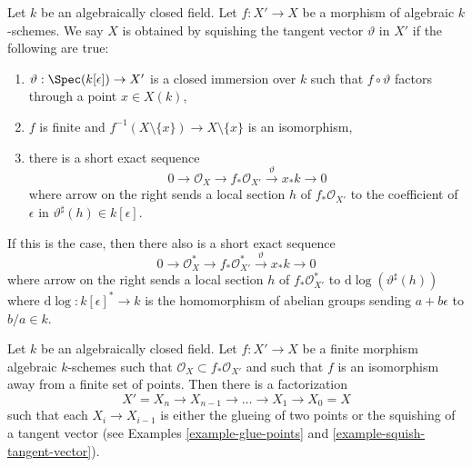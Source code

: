 \begin{example}
\label{example-squish-tangent-vector}
Let $k$ be an algebraically closed field. Let $f : X' \to X$
be a morphism of algebraic $k$-schemes. We say $X$ is
obtained by squishing the tangent vector $\vartheta$ in $X'$
if the following are true:
\begin{enumerate}
\item $\vartheta : \Spec(k[\epsilon]) \to X'$ is a closed immersion
over $k$ such that $f \circ \vartheta$ factors through a point $x \in X(k)$,
\item $f$ is finite and
$f^{-1}(X \setminus \{x\}) \to X \setminus \{x\}$ is an isomorphism,
\item there is a short exact sequence
$$
0 \to \mathcal{O}_X \to f_*\mathcal{O}_{X'} \xrightarrow{\vartheta} x_*k \to 0
$$
where arrow on the right sends a local section $h$ of $f_*\mathcal{O}_{X'}$
to the coefficient of $\epsilon$ in $\vartheta^\sharp(h) \in k[\epsilon]$.
\end{enumerate}
If this is the case, then there also is a short exact sequence
$$
0 \to \mathcal{O}_X^* \to f_*\mathcal{O}_{X'}^*
\xrightarrow{\vartheta} x_*k \to 0
$$
where arrow on the right sends a local section $h$ of $f_*\mathcal{O}_{X'}^*$
to $\text{d}\log(\vartheta^\sharp(h))$ where
$\text{d}\log : k[\epsilon]^* \to k$
is the homomorphism of abelian groups sending $a + b\epsilon$ to $b/a \in k$.
\end{example}

\begin{lemma}
\label{lemma-factor-almost-isomorphism}
Let $k$ be an algebraically closed field. Let $f : X' \to X$ be a
finite morphism algebraic $k$-schemes such that
$\mathcal{O}_X \subset f_*\mathcal{O}_{X'}$ and such that $f$ is an
isomorphism away from a finite set of points. Then there is a factorization
$$
X' = X_n \to X_{n - 1} \to \ldots \to X_1 \to X_0 = X
$$
such that each $X_i \to X_{i - 1}$ is either the glueing of
two points or the squishing of a tangent vector
(see Examples \ref{example-glue-points} and
\ref{example-squish-tangent-vector}).
\end{lemma}

